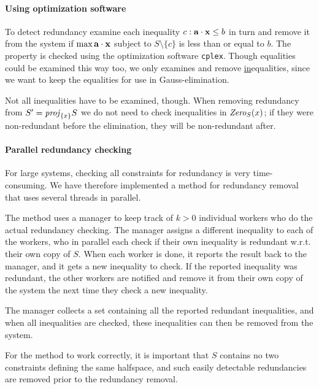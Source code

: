 \paragraph{Using optimization software}
To detect redundancy examine each inequality $c: \mathbf{a}\cdot \mathbf{x}\leq b$ in turn and remove it from the system if $\max \mathbf{a}\cdot \mathbf{x}$ subject to $S\setminus\{c\}$ is less than or equal to $b$. The property is checked using the optimization software \texttt{cplex}. Though equalities could be examined this way too, we only examines and remove \underline{in}equalities, since we want to keep the equalities for use in Gauss-elimination.

Not all inequalities have to be examined, though. When removing redundancy from $S' = \mathit{proj}_{\{x\}}S$ we do not need to check inequalities in $\mathit{Zero}_S(x)$; if they were non-redundant before the elimination, they will be non-redundant after.

\paragraph{Parallel redundancy checking}
For large systems, checking all constraints for redundancy is very time-consuming. We have therefore implemented a method for redundancy removal that uses several threads in parallel. 

The method uses a manager to keep track of $k>0$ individual workers who do the actual redundancy checking.
The manager assigns a different inequality to each of the workers, who in parallel each check if their own inequality is redundant w.r.t. their own copy of $S$. When each worker is done, it reports the result back to the manager, and it gets a new inequality to check.  
If the reported inequality was redundant, the other workers are notified and remove it from their own copy of the system the next time they check a new inequality. 

The manager collects a set containing all the reported redundant inequalities, and when all inequalities are checked, these inequalities can then be removed from the system.

For the method to work correctly, it is important that $S$ contains no two constraints defining the same halfspace, and such easily detectable redundancies are removed prior to the redundancy removal.

